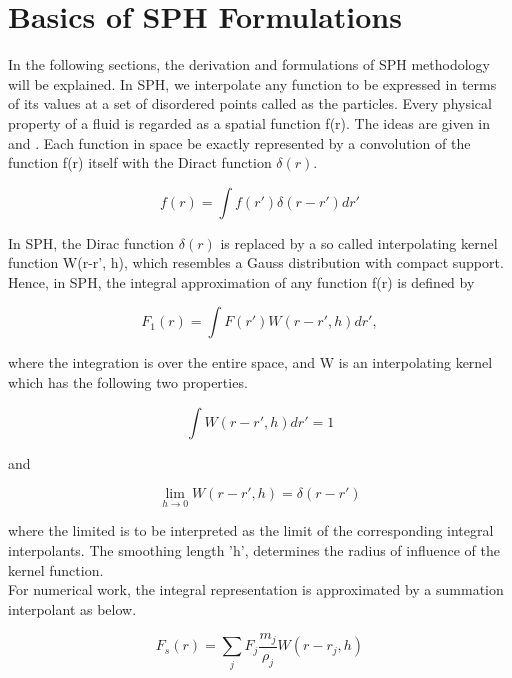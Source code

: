 
\chapter{Basics of SPH Formulations}

In the following sections, the derivation and formulations of SPH methodology will be explained.
In SPH, we interpolate any function to be expressed in terms of its values at a set of disordered points called as the particles.
Every physical property of a fluid is regarded as a spatial function f(r). 
The ideas are given in \citep{Monaghan1977} and \citep{Lucy}. 
Each function in space be exactly represented by a convolution of the function f(r) itself with the Diract function $\delta (r)$.

\begin{equation}
 f(r) = \int f(r')\delta(r - r')dr'
\end{equation}

In SPH, the Dirac function $\delta (r)$ is replaced by a so called interpolating kernel function W(r-r', h), which resembles a Gauss distribution with compact support. Hence, in SPH, the integral approximation of any function f(r) is defined by

\begin{equation}
 F_1 (r) = \int F(r') W(r-r', h) dr' ,
\end{equation}

\noindent
where the integration is over the entire space, and W is an interpolating kernel which has the following two properties.

\begin{equation}
 \int W(r-r', h)dr' = 1
\end{equation}

\noindent
and 

\begin{equation}
 \lim_{h\to0} W(r-r', h) = \delta(r-r')
\end{equation}

\noindent
where the limited is to be interpreted as the limit of the corresponding integral interpolants. The smoothing length 'h', determines the radius of influence of the kernel function. \\

For numerical work, the integral representation is approximated by a summation interpolant as below.

\begin{equation}
 F_s (r) = \sum_{j} F_j \frac{m_j}{\rho_j} W(r-r_j, h)
 \label{interpolation}
\end{equation}


